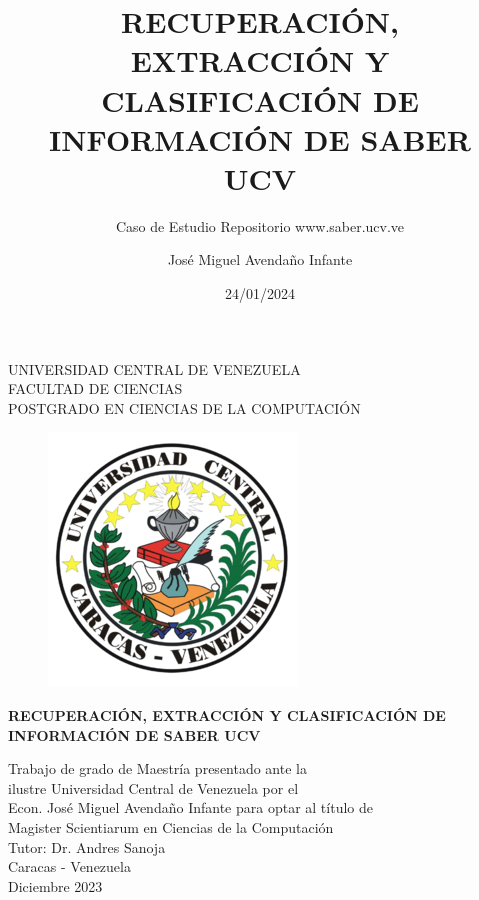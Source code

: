 \documentclass[
  12pt,
  openany]{book}
\title{RECUPERACIÓN, EXTRACCIÓN Y CLASIFICACIÓN DE INFORMACIÓN DE SABER UCV}
\subtitle{Caso de Estudio Repositorio www.saber.ucv.ve}
\author{José Miguel Avendaño Infante}
\date{24/01/2024}
\begin{document}
\maketitle

\thispagestyle{empty}
\begin{center}
	UNIVERSIDAD CENTRAL DE VENEZUELA\\
	FACULTAD DE CIENCIAS\\
	POSTGRADO EN CIENCIAS DE LA COMPUTACI\'ON\\

	\begin{figure}
						\centering
						  \includegraphics[height=.7\textwidth]{images/UCV.png}
  \end{figure}
  \vspace{1.5cm}
  \large{\textbf{RECUPERACI\'ON, EXTRACCI\'ON Y CLASIFICACI\'ON DE \\ INFORMACI\'ON DE SABER UCV}}

  \vspace{3cm}
  Trabajo de grado de Maestría presentado ante la \\
  ilustre Universidad Central de Venezuela por el\\
  Econ. José Miguel Avendaño Infante para  optar
  al título de \\Magister Scientiarum en Ciencias de la Computaci\'on\\
  \vspace{0.5cm}
  Tutor: Dr. Andres Sanoja\\
  \vspace{1.5cm}
  Caracas - Venezuela\\
  Diciembre 2023
\end{center}
\end{document}
